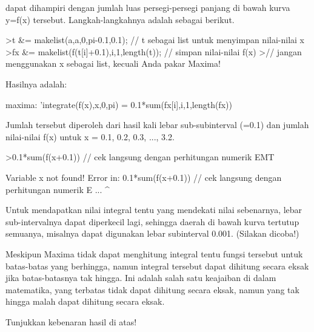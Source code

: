 \documentclass[a4paper,10pt]{article}
\begin{document}
\begin{eulernotebook}
\begin{eulercomment}
\begin{eulercomment}
\begin{eulercomment}
\begin{eulercomment}
\begin{eulercomment}
dapat dihampiri dengan jumlah luas persegi-persegi panjang di bawah kurva y=f(x)
tersebut. Langkah-langkahnya adalah sebagai berikut.
\end{eulercomment}
\begin{eulerprompt}
>t &= makelist(a,a,0,pi-0.1,0.1); // t sebagai list untuk menyimpan nilai-nilai x
>fx &= makelist(f(t[i]+0.1),i,1,length(t)); // simpan nilai-nilai f(x)
>// jangan menggunakan x sebagai list, kecuali Anda pakar Maxima!
\end{eulerprompt}
\begin{eulercomment}
Hasilnya adalah:

maxima: 'integrate(f(x),x,0,pi) = 0.1*sum(fx[i],i,1,length(fx))

Jumlah tersebut diperoleh dari hasil kali lebar sub-subinterval (=0.1) dan jumlah nilai-nilai f(x) untuk
x = 0.1, 0.2, 0.3, ..., 3.2.
\end{eulercomment}
\begin{eulerprompt}
>0.1*sum(f(x+0.1)) // cek langsung dengan perhitungan numerik EMT
\end{eulerprompt}
\begin{euleroutput}
  Variable x not found!
  Error in:
  0.1*sum(f(x+0.1)) // cek langsung dengan perhitungan numerik E ...
                 ^
\end{euleroutput}
\begin{eulercomment}
Untuk mendapatkan nilai integral tentu yang mendekati nilai sebenarnya, lebar
sub-intervalnya dapat diperkecil lagi, sehingga daerah di bawah kurva tertutup
semuanya, misalnya dapat digunakan lebar subinterval 0.001. (Silakan dicoba!)

Meskipun Maxima tidak dapat menghitung integral tentu fungsi tersebut untuk
batas-batas yang berhingga, namun integral tersebut dapat dihitung secara eksak jika
batas-batasnya tak hingga. Ini adalah salah satu keajaiban di dalam matematika, yang
terbatas tidak dapat dihitung secara eksak, namun yang tak hingga malah dapat
dihitung secara eksak.
\end{eulercomment}
\begin{eulercomment}
Tunjukkan kebenaran hasil di atas!


\end{eulercomment}
\end{eulercomment}
\end{eulercomment}
\end{eulercomment}
\end{eulercomment}
\end{eulernotebook}
\end{document}
